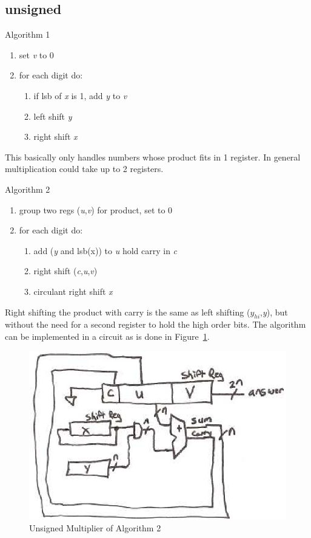 \subsection{unsigned}

Algorithm 1
\begin{enumerate}
    \item set \emph{v} to 0
    \item for each digit do:
    \begin{enumerate}
        \item if lsb of \emph{x} is 1, add \emph{y} to \emph{v}
        \item left shift \emph{y}
        \item right shift \emph{x}
    \end{enumerate}
\end{enumerate}

This basically only handles numbers whose product fits in 1 register.  In general multiplication could take up to 2 registers.

\noindent
Algorithm 2
\begin{enumerate}
    \item group two regs (\emph{u},\emph{v}) for product, set to 0
    \item for each digit do:
    \begin{enumerate}
        \item  add (\emph{y} and lsb(x)) to \emph{u} hold carry in \emph{c}
        \item right shift (\emph{c},\emph{u},\emph{v})
        \item circulant right shift \emph{x}
    \end{enumerate}
\end{enumerate}

Right shifting the product with carry is the same as left shifting (\emph{$y_{hi}$},\emph{y}), but without the need for a second register to hold the high order bits.  The algorithm can be implemented in a circuit as is done in Figure~\ref{f-unsigned_mult}.

\begin{figure}
\caption{Unsigned Multiplier of Algorithm 2}\label{f-unsigned_mult}
\begin{center}
\includegraphics{unsigned_mult.eps}
\end{center}
\end{figure}

